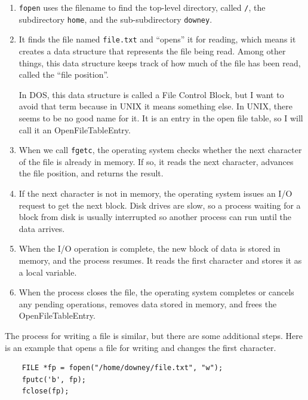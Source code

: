 \documentclass[12pt]{book}
\begin{document}
\begin{enumerate}

\item {\tt fopen} uses the filename to find the top-level directory,
  called \verb"/", the subdirectory {\tt home}, and the
  sub-subdirectory {\tt downey}.

\item It finds the file named {\tt file.txt} and ``opens'' it for
  reading, which means it creates a data structure that represents the
  file being read.  Among other things, this data structure
  keeps track of how much of the file has been read, called the ``file
  position''.

  In DOS, this data structure is called a File Control Block, but I
  want to avoid that term because in UNIX it means something else.  In
  UNIX, there seems to be no good name for it.  It is an entry in the
  open file table, so I will call it an OpenFileTableEntry.

\item When we call {\tt fgetc}, the operating system checks whether
  the next character of the file is already in memory.  If so, it
  reads the next character, advances the file position, and returns
  the result.

\item If the next character is not in memory, the operating
  system issues an I/O request to get the next block.  Disk drives are
  slow, so a process waiting for a block from disk is usually
  interrupted so another process can run until the data arrives.

\item When the I/O operation is complete, the new block of data is
  stored in memory, and the process resumes.  It reads the first
  character and stores it as a local variable.

\item When the process closes the file, the operating system completes
  or cancels any pending operations, removes data stored in
  memory, and frees the OpenFileTableEntry.

\end{enumerate}

The process for writing a file is similar, but there are some
additional steps.  Here is an example that opens a file for
writing and changes the first character.

\begin{verbatim}
    FILE *fp = fopen("/home/downey/file.txt", "w");
    fputc('b', fp);
    fclose(fp);
\end{verbatim}
\end{document}
